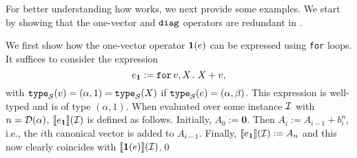 %
%
%
%





For better understanding how \langfor  works, we next provide some  examples.
We start by showing that the one-vector and $\texttt{diag}$ operators are redundant
in \langfor.
\begin{example}
We first show how the one-vector operator $\mathbf{1}(e)$ can be expressed using \texttt{for} loops.
It suffices to consider the expression
$$e_{\mathbf{1}}:=\texttt{for}\, v,X \texttt{.}\, X+v,$$
with $\texttt{type}_{\mathcal{S}}(v)=(\alpha,1)=\texttt{type}_{\mathcal{S}}(X)$ if $\texttt{type}_{\mathcal{S}}(e)=(\alpha,\beta)$. This expression is well-typed
and is of type $(\alpha,1)$. When evaluated over some instance $\mathcal{I}$ with $n=\mathcal{D}(\alpha)$, $\llbracket e_{\mathbf{1}} \rrbracket(\mathcal{I})$ is defined as follows.
Initially, $A_0:=\mathbf{0}$. Then $A_i:=A_{i-1}+b_i^n$, i.e., the $i$th canonical vector is added to $A_{i-1}$.
Finally, $\llbracket e_{\mathbf{1}} \rrbracket(\mathcal{I}):=A_n$ and this now clearly coincides with $\llbracket \mathbf{1}(e) \rrbracket(\mathcal{I})$.\qed
\end{example}

